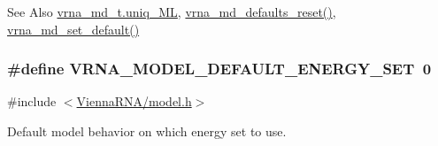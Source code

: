 \begin{DoxySeeAlso}{See Also}
\hyperlink{group__model__details_ade065b814a4e2e72ead93ab502613ed2}{vrna\-\_\-md\-\_\-t.\-uniq\-\_\-\-M\-L}, \hyperlink{group__model__details_ga70834424cf804d149937de89f80ceb45}{vrna\-\_\-md\-\_\-defaults\-\_\-reset()}, \hyperlink{group__model__details_ga8ac6ff84936282436f822644bf841f66}{vrna\-\_\-md\-\_\-set\-\_\-default()} 
\end{DoxySeeAlso}
\hypertarget{group__model__details_ga6fcf6b2d0f89256cdbd166486c9b6e1e}{
\subsubsection[{V\-R\-N\-A\-\_\-\-M\-O\-D\-E\-L\-\_\-\-D\-E\-F\-A\-U\-L\-T\-\_\-\-E\-N\-E\-R\-G\-Y\-\_\-\-S\-E\-T}]{\setlength{\rightskip}{0pt plus 5cm}\#define V\-R\-N\-A\-\_\-\-M\-O\-D\-E\-L\-\_\-\-D\-E\-F\-A\-U\-L\-T\-\_\-\-E\-N\-E\-R\-G\-Y\-\_\-\-S\-E\-T~0}}\label{group__model__details_ga6fcf6b2d0f89256cdbd166486c9b6e1e}


{\ttfamily \#include $<$\hyperlink{model_8h}{Vienna\-R\-N\-A/model.\-h}$>$}



Default model behavior on which energy set to use. 

